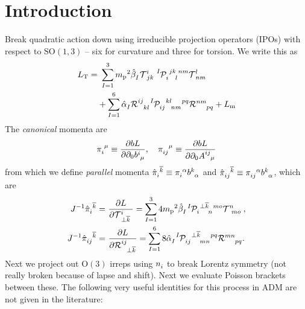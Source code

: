 \documentclass[aps,prd,reprint,preprintnumbers,superscriptaddress,showpacs,floatfix]{revtex4-2}
\begin{document}
\section{Introduction}
Break quadratic action down using irreducible projection operators (IPOs) with respect to $\mathrm{SO}(1,3)$ -- six for curvature and three for torsion. We write this as
\begin{equation}
\begin{aligned}
  L_{\text{T}}=&\ \sum_{I=1}^{3}{m_\text{p}}^2\tensor{\hat{\beta}}{_I}\tensor{\mathcal{  T}}{^{i}_{jk}}\tensor[^I]{\mathcal{  P}}{_{i}^{jk}_{l}^{nm}}\tensor{\mathcal{  T}}{^{l}_{nm}}\\
  &+\sum_{I=1}^{6}\tensor{\hat{\alpha}}{_I}\tensor{\mathcal{  R}}{^{ij}_{kl}}\tensor[^I]{\mathcal{  P}}{_{ij}^{kl}_{nm}^{pq}}\tensor{\mathcal{  R}}{^{nm}_{pq}}+L_{\text{m}}
  \label{<+label+>}
\end{aligned}
\end{equation}
The \emph{canonical} momenta are 
\begin{equation}
  \tensor{\pi}{_i^\mu}\equiv\frac{\partial bL}{\partial\partial_0\tensor{b}{^i_{\mu}}}, \quad \tensor{\pi}{_{ij}^{\mu}}\equiv\frac{\partial bL}{\partial\partial_0\tensor{A}{^{ij}_{\mu}}}
  \label{<+label+>}
\end{equation}
from which we define \emph{parallel} momenta $\tensor{\hat{\pi}}{_{i}^{\overline{k}}}\equiv\tensor{\pi}{_{i}^\alpha}\tensor{b}{^{k}_\alpha}$ and $\tensor{\hat{\pi}}{_{ij}^{\overline{k}}}\equiv\tensor{\pi}{_{ij}^\alpha}\tensor{b}{^{k}_\alpha}$, which are
\begin{subequations}
  \begin{align}
    J^{-1}\tensor{\hat{\pi}}{_{i}^{\overline{k}}}=&\ \frac{\partial L}{\partial \tensor{\mathcal{  T}}{^i_{\perp\overline{k}}}}=\sum_{I=1}^{3}4{m_\text{p}}^2\tensor{\hat{\beta}}{_{I}}\tensor[^I]{\mathcal{  P}}{_i^{\perp\overline{k}}_n^{mo}}\tensor{\mathcal{  T}}{^n_{mo}},\\
    J^{-1}\tensor{\hat{\pi}}{_{ij}^{\overline{k}}}=&\ \frac{\partial L}{\partial \tensor{\mathcal{  R}}{^{ij}_{\perp\overline{k}}}}=\sum_{I=1}^{6}8\tensor{\hat{\alpha}}{_{I}}\tensor[^I]{\mathcal{  P}}{_{ij}^{\perp\overline{k}}_{mn}^{pq}}\tensor{\mathcal{  R}}{^{mn}_{pq}}.
    \label{<+label+>}
  \end{align}
  \label{<+label+>}
\end{subequations}
Next we project out $\mathrm{O}(3)$ irreps using $\tensor{n}{_i}$ to break Lorentz symmetry (not really broken because of lapse and shift). Next we evaluate Poisson brackets between these. The following very useful identities for this process in ADM are not given in the literature: 
\end{document}
